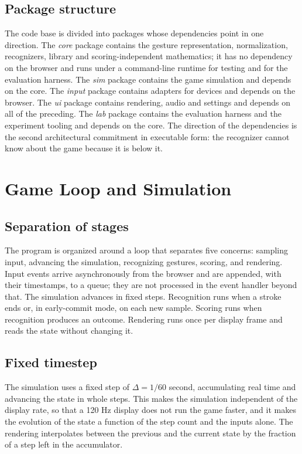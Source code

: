\section{Package structure}

The code base is divided into packages whose dependencies point in one direction. The \emph{core} package contains the gesture representation, normalization, recognizers, library and scoring-independent mathematics; it has no dependency on the browser and runs under a command-line runtime for testing and for the evaluation harness. The \emph{sim} package contains the game simulation and depends on the core. The \emph{input} package contains adapters for devices and depends on the browser. The \emph{ui} package contains rendering, audio and settings and depends on all of the preceding. The \emph{lab} package contains the evaluation harness and the experiment tooling and depends on the core. The direction of the dependencies is the second architectural commitment in executable form: the recognizer cannot know about the game because it is below it.

\chapter{Game Loop and Simulation}\label{ch:game-loop}

\section{Separation of stages}

The program is organized around a loop that separates five concerns: sampling input, advancing the simulation, recognizing gestures, scoring, and rendering. Input events arrive asynchronously from the browser and are appended, with their timestamps, to a queue; they are not processed in the event handler beyond that. The simulation advances in fixed steps. Recognition runs when a stroke ends or, in early-commit mode, on each new sample. Scoring runs when recognition produces an outcome. Rendering runs once per display frame and reads the state without changing it.

\section{Fixed timestep}

The simulation uses a fixed step of $\Delta=1/60$ second, accumulating real time and advancing the state in whole steps. This makes the simulation independent of the display rate, so that a 120 Hz display does not run the game faster, and it makes the evolution of the state a function of the step count and the inputs alone. The rendering interpolates between the previous and the current state by the fraction of a step left in the accumulator.

